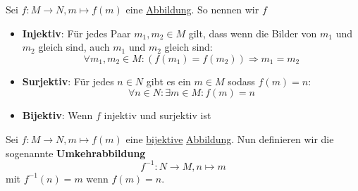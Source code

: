 \documentclass[../../main.tex]{subfiles}
\begin{document}
	\begin{definition}
		\label{def:Injektiv}
		\label{def:Surjketiv}
		\label{def:Bijektiv}
		Sei $f: M \rightarrow N, m \mapsto f(m)$ eine \hyperref[def:Abbildung]{Abbildung}. So nennen wir $f$
		\begin{itemize}
			\item \textbf{Injektiv}: Für jedes Paar $m_1,m_2 \in M$ gilt, dass wenn die Bilder von $m_1$ und $m_2$ gleich sind, auch $m_1$ und $m_2$ gleich sind: $$\forall m_1,m_2 \in M: (f(m_1)=f(m_2)) \Rightarrow m_1 = m_2$$
			\item \textbf{Surjektiv}: Für jedes $n \in N$ gibt es ein $m \in M$ sodass $f(m)=n$: $$\forall n \in N: \exists m \in M: f(m)=n$$
			\item \textbf{Bijektiv}: Wenn $f$ injektiv und surjektiv ist
		\end{itemize}
	\end{definition}

	\begin{definition}[Umkehrabbildung]
		Sei $f: M \rightarrow N, m \mapsto f(m)$ eine \hyperref[def:Bijektiv]{bijektive} \hyperref[def:Abbildung]{Abbildung}. Nun definieren wir die sogenannte \textbf{Umkehrabbildung} $$f^{-1}: N \rightarrow M, n \mapsto m$$ mit $f^{-1}(n)=m$ wenn $f(m)=n$.
	\end{definition}
\end{document}
